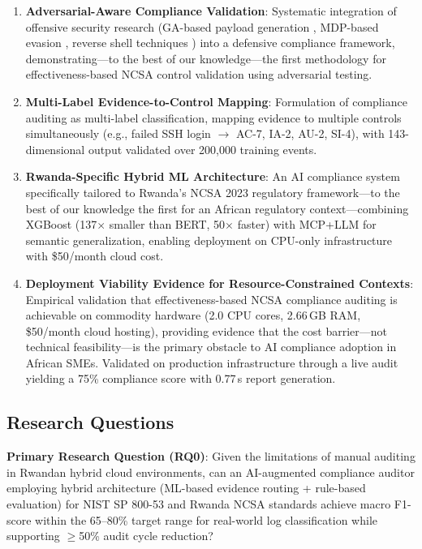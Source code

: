 \documentclass[11pt,conference]{IEEEtran}
\begin{document}
\begin{enumerate}
    \item \textbf{Adversarial-Aware Compliance Validation}: Systematic integration of offensive security research (GA-based payload generation \cite{ga_xss_paper}, MDP-based evasion \cite{dp_payload_paper}, reverse shell techniques \cite{reverse_shell_paper}) into a defensive compliance framework, demonstrating---to the best of our knowledge---the first methodology for effectiveness-based NCSA control validation using adversarial testing.

    \item \textbf{Multi-Label Evidence-to-Control Mapping}: Formulation of compliance auditing as multi-label classification, mapping evidence to multiple controls simultaneously (e.g., failed SSH login $\rightarrow$ AC-7, IA-2, AU-2, SI-4), with 143-dimensional output validated over 200,000 training events.

    \item \textbf{Rwanda-Specific Hybrid ML Architecture}: An AI compliance system specifically tailored to Rwanda's NCSA 2023 regulatory framework---to the best of our knowledge the first for an African regulatory context---combining XGBoost (137$\times$ smaller than BERT, 50$\times$ faster) with MCP+LLM for semantic generalization, enabling deployment on CPU-only infrastructure with \$50/month cloud cost.

    \item \textbf{Deployment Viability Evidence for Resource-Constrained Contexts}: Empirical validation that effectiveness-based NCSA compliance auditing is achievable on commodity hardware (2.0 CPU cores, 2.66\,GB RAM, \$50/month cloud hosting), providing evidence that the cost barrier---not technical feasibility---is the primary obstacle to AI compliance adoption in African SMEs. Validated on production infrastructure through a live audit yielding a 75\% compliance score with 0.77\,s report generation.
\end{enumerate}

\subsection{Research Questions}

\textbf{Primary Research Question (RQ0)}: Given the limitations of manual auditing in Rwandan hybrid cloud environments, can an AI-augmented compliance auditor employing hybrid architecture (ML-based evidence routing + rule-based evaluation) for NIST SP 800-53 and Rwanda NCSA standards achieve macro F1-score within the 65--80\% target range for real-world log classification while supporting $\geq$50\% audit cycle reduction?
\end{document}
